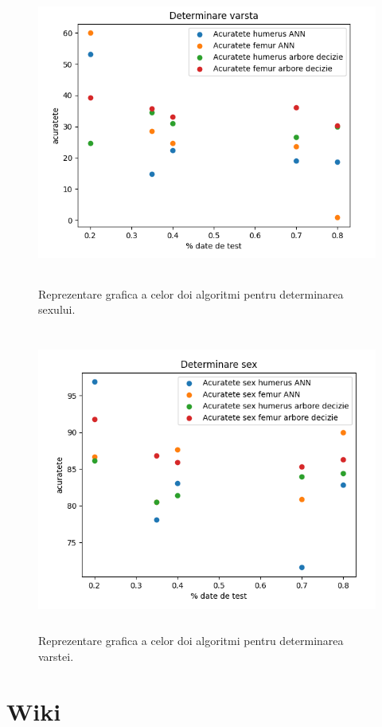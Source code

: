 \documentclass[runningheads,a4paper,11pt]{report}
\begin{document}
\begin{figure}[!h]
    \centering
    \includegraphics[width=18cm, height=10cm]{Imagini/plot_age.PNG}
    \caption{Reprezentare grafica a celor doi algoritmi pentru determinarea sexului.}
    \label{plot_sex}
\end{figure}

\begin{figure}[!h]
    \centering
    \includegraphics[width=18cm, height=10cm]{Imagini/plot_sex.PNG}
    \caption{Reprezentare grafica a celor doi algoritmi pentru determinarea varstei.}
    \label{plot_age}
\end{figure}

\chapter{Wiki}
\label{chapter:wiki}
\end{document}
